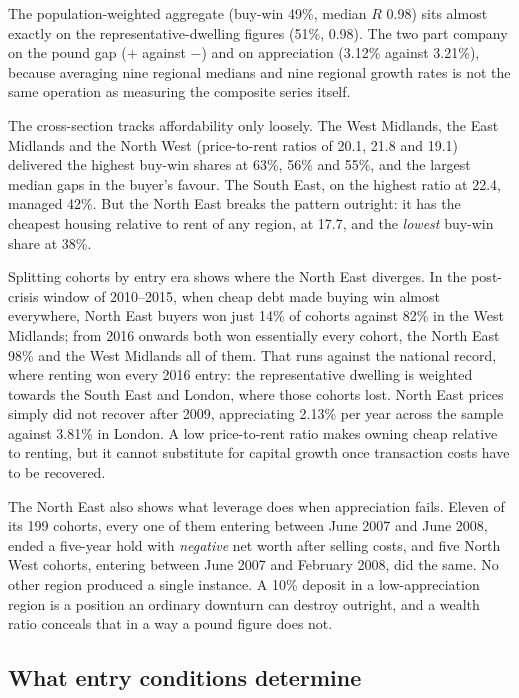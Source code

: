 The population-weighted aggregate (buy-win 49\%, median $R$ 0.98) sits almost exactly on the representative-dwelling figures (51\%, 0.98). The two part company on the pound gap ($+$ against $-$) and on appreciation (3.12\% against 3.21\%), because averaging nine regional medians and nine regional growth rates is not the same operation as measuring the composite series itself.

The cross-section tracks affordability only loosely. The West Midlands, the East Midlands and the North West (price-to-rent ratios of 20.1, 21.8 and 19.1) delivered the highest buy-win shares at 63\%, 56\% and 55\%, and the largest median gaps in the buyer's favour. The South East, on the highest ratio at 22.4, managed 42\%. But the North East breaks the pattern outright: it has the cheapest housing relative to rent of any region, at 17.7, and the \emph{lowest} buy-win share at 38\%.

Splitting cohorts by entry era shows where the North East diverges. In the post-crisis window of 2010--2015, when cheap debt made buying win almost everywhere, North East buyers won just 14\% of cohorts against 82\% in the West Midlands; from 2016 onwards both won essentially every cohort, the North East 98\% and the West Midlands all of them. That runs against the national record, where renting won every 2016 entry: the representative dwelling is weighted towards the South East and London, where those cohorts lost. North East prices simply did not recover after 2009, appreciating 2.13\% per year across the sample against 3.81\% in London. A low price-to-rent ratio makes owning cheap relative to renting, but it cannot substitute for capital growth once transaction costs have to be recovered.

The North East also shows what leverage does when appreciation fails. Eleven of its 199 cohorts, every one of them entering between June 2007 and June 2008, ended a five-year hold with \emph{negative} net worth after selling costs, and five North West cohorts, entering between June 2007 and February 2008, did the same. No other region produced a single instance. A 10\% deposit in a low-appreciation region is a position an ordinary downturn can destroy outright, and a wealth ratio conceals that in a way a pound figure does not.

\subsection{What entry conditions determine}
\label{sec:predictors}

